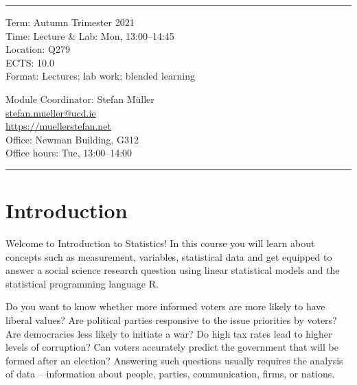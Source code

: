 \documentclass[abstract=on,parskip=full,headings=standardclasses,fontsize=11pt,paper=a4]{scrartcl}
\begin{document}
\vspace{1.5cm}



\hrule
\medskip
\begin{minipage}[t]{0.5\textwidth}
Term: Autumn Trimester 2021 \\
Time: Lecture \& Lab: Mon, 13:00--14:45 \\
Location:  Q279 \\
ECTS: 10.0 \\
Format: Lectures; lab work; blended learning
\end{minipage}
\begin{minipage}[t]{0.49\textwidth}
\begin{flushright}
Module Coordinator: Stefan Müller \\
 \href{mailto:stefan.mueller@ucd.ie}{\textsf{stefan.mueller@ucd.ie}} \\
 \url{https://muellerstefan.net} \\
Office:  Newman Building, G312 \\
Office hours: Tue, 13:00--14:00
\end{flushright}
\end{minipage}
\medskip
\hrule 

\section*{Introduction}


Welcome to Introduction to Statistics! In this course you will learn about concepts such as measurement, variables, statistical data and get equipped to answer a social science research question using linear statistical models and the statistical programming language \textsf{R}.

Do you want to know whether more informed voters are more likely to have liberal values? Are political parties responsive to the issue priorities by voters? Are  democracies less likely to initiate a war? Do high tax rates lead to higher levels of corruption? Can voters accurately predict the government that will be formed after an election? Answering such questions usually requires the analysis of data  
-- information about people, parties, communication, firms, or nations.
\end{document}
